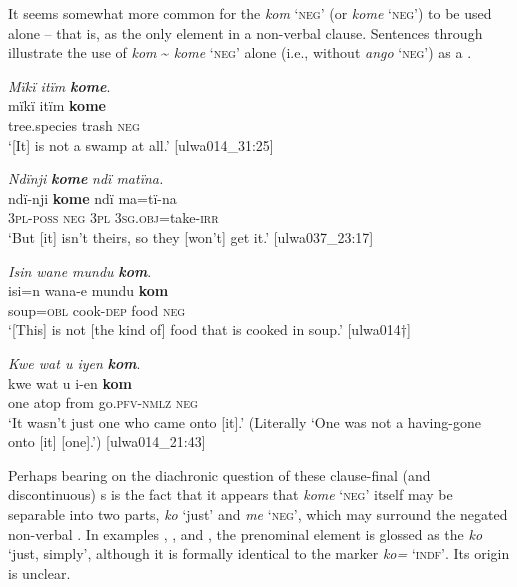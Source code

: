 It seems somewhat more common for the  \textit{kom} ‘\textsc{neg’} (or \textit{kome} ‘\textsc{neg’}) to be used alone -- that is, as the only  element in a  non-verbal clause. Sentences  through  illustrate the use of \textit{kom} {\textasciitilde} \textit{kome} ‘\textsc{neg}’ alone (i.e., without \textit{ango} ‘\textsc{neg’}) as a .

\ea%
    \label{ex:syntax:158}
          \textit{Mïkï itïm} \textbf{\textit{kome}}.\\
\gll mïkï  itïm  \textbf{kome}\\
    tree.species  trash  \textsc{neg}\\
\glt `[It] is not a swamp at all.’ [ulwa014\_31:25]
\z

\ea%
    \label{ex:syntax:159}
          \textit{Ndïnji} \textbf{\textit{kome}} \textit{ndï matïna.}\\
\gll    ndï-nji    \textbf{kome}  ndï  ma=tï-na\\
    3\textsc{pl-poss}  \textsc{neg}  \textsc{3pl}  \textsc{3sg.obj=}take-\textsc{irr}\\
\glt `But [it] isn’t theirs, so they [won’t] get it.’ [ulwa037\_23:17]
\z

\ea%
    \label{ex:syntax:160}
          \textit{Isin wane mundu} \textbf{\textit{kom}}.\\
\gll isi=n    wana-e    mundu  \textbf{kom}\\
    soup=\textsc{obl}  cook-\textsc{dep}  food  \textsc{neg}\\
\glt `[This] is not [the kind of] food that is cooked in soup.’ [ulwa014†]
\z

\ea%
    \label{ex:syntax:161}
          \textit{Kwe wat u iyen} \textbf{\textit{kom}}.\\
\gll kwe  wat    u    i-en      \textbf{kom}\\
    one    atop  from  go.\textsc{pfv-nmlz}  \textsc{neg}\\
\glt `It wasn’t just one who came onto [it].’ (Literally ‘One was not a having-gone onto [it] [one].’) [ulwa014\_21:43]
\z


Perhaps bearing on the diachronic question of these clause-final (and discontinuous) s is the fact that it appears that \textit{kome} ‘\textsc{neg’} itself may be separable into two parts, \textit{ko} ‘just’ and \textit{me} ‘\textsc{neg’}, which may surround the negated  non-verbal . In examples , , and , the prenominal element is glossed as the  \textit{ko} ‘just, simply’, although it is formally identical to the  marker \textit{ko=} ‘\textsc{indf’}. Its origin is unclear.

